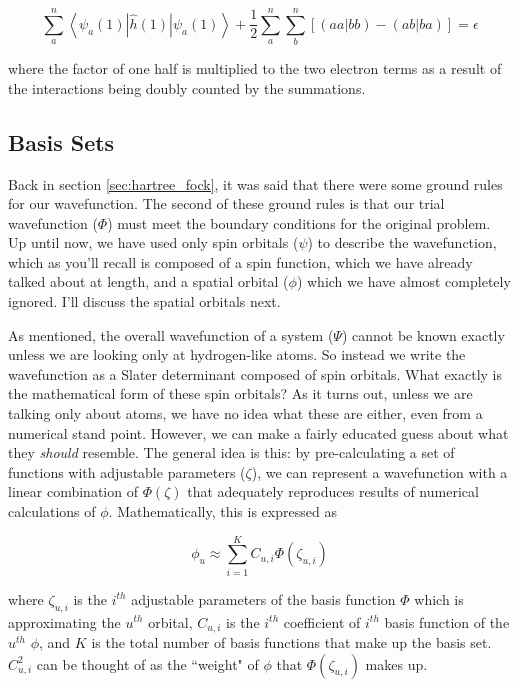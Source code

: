  \begin{equation}
\label{eq:hartree-fock_eq}
\sum_{a}^{n}\left<\psi_{a}(1)|\hat{h}(1)|\psi_{a}(1)\right> + \frac{1}{2}\sum^{n}_{a}\sum^{n}_{b}\left[\left(aa|bb\right) - \left(ab|ba\right)\right] = \epsilon
\end{equation}

where the factor of one half is multiplied to the two electron terms as a result of the interactions being doubly counted by the summations.

\subsection{Basis Sets}
\label{subsec:basis_sets}
Back in section \ref{sec:hartree_fock}, it was said that there were some ground rules for our wavefunction. The second of these ground rules is that our trial wavefunction ($\Phi$) must meet the boundary conditions for the original problem. Up until now, we have used only spin orbitals ($\psi$) to describe the wavefunction, which as you'll recall is composed of a spin function, which we have already talked about at length, and a spatial orbital ($\phi$) which we have almost completely ignored. I'll discuss the spatial orbitals next. 

As mentioned, the overall wavefunction of a system ($\Psi$) cannot be known exactly unless we are looking only at hydrogen-like atoms. So instead we write the wavefunction as a Slater determinant composed of spin orbitals. What exactly is the mathematical form of these spin orbitals? As it turns out, unless we are talking only about atoms, we have no idea what these are either, even from a numerical stand point. However, we can make a fairly educated guess about what they \textit{should} resemble. The general idea is this: by pre-calculating a set of functions with adjustable parameters ($\zeta$), we can represent a wavefunction with a linear combination of $\Phi(\zeta)$ that adequately reproduces results of numerical calculations of $\phi$. Mathematically, this is expressed as\cite{Ostlund}

\begin{equation}
\label{eq:linear_comb_bs}
\phi_{u} \approx \sum^{K}_{i=1}C_{u,i}\Phi(\zeta_{u,i})
\end{equation}

where $\zeta_{u,i}$ is the $i^{th}$ adjustable parameters of the basis function $\Phi$ which is approximating the $u^{th}$ orbital, $C_{u,i}$ is the $i^{th}$ coefficient of $i^{th}$ basis function of the $u^{th}$ $\phi$, and $K$ is the total number of basis functions that make up the basis set. $C^{2}_{u,i}$ can be thought of as the ``weight" of $\phi$ that $\Phi(\zeta_{u,i})$ makes up.

